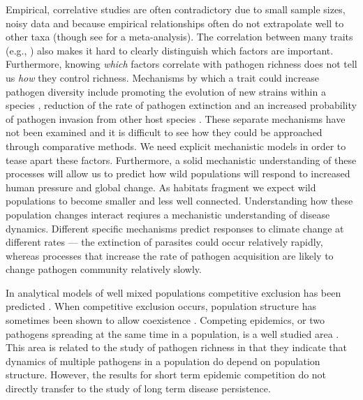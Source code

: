 Empirical, correlative studies are often contradictory due to small sample sizes, noisy data and because empirical relationships often do not extrapolate well to other taxa (though see \textcite{kamiya2014determines} for a meta-analysis).
The correlation between many traits (e.g., \textcite{nunn2015infectious}) also makes it hard to clearly distinguish which factors are important.
Furthermore, knowing \emph{which} factors correlate with pathogen richness does not tell us \emph{how} they control richness. 
Mechanisms by which a trait could increase pathogen diversity include promoting the evolution of new strains within a species \cite{buckee2004effects}, reduction of the rate of pathogen extinction \cite{rand1995invasion} and an increased probability of pathogen invasion from other host species \cite{nunes2006localized}.
These separate mechanisms have not been examined and it is difficult to see how they could be approached through comparative methods.
We need explicit mechanistic models in order to tease apart these factors.
Furthermore, a solid mechanistic understanding of these processes will allow us to predict how wild populations will respond to increased human pressure and global change.
As habitats fragment we expect wild populations to become smaller and less well connected.
Understanding how these population changes interact reqiures a mechanistic understanding of disease dynamics.
Different specific mechanisms predict responses to climate change at different rates --- the extinction of parasites could occur relatively rapidly, whereas processes that increase the rate of pathogen acquisition are likely to change pathogen community relatively slowly.




 

In analytical models of well mixed populations competitive exclusion has been predicted \cite{ackleh2003competitive, bremermann1989competitive, martcheva2013competitive, qiu2013vector, allen2004sis}.
When competitive exclusion occurs, population structure has sometimes been shown to allow coexistence \cite{qiu2013vector, allen2004sis, nunes2006localized, garmer2016multistrain}.
Competing epidemics, or two pathogens spreading at the same time in a population, is a well studied area \cite{poletto2013host, poletto2015characterising, karrer2011competing}. 
This area is related to the study of pathogen richness in that they indicate that dynamics of multiple pathogens in a population do depend on population structure.
However, the results for short term epidemic competition do not directly transfer to the study of long term disease persistence.


